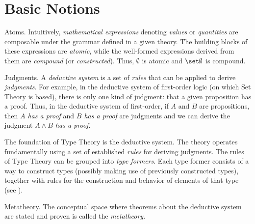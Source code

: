 \section{Basic Notions}
\begin{lpar}{Atoms.}
    Intuitively, \textsl{mathematical expressions} denoting \textit{values} or \textit{quantities} are composable under the grammar defined in a given theory. The building blocks of these expressions are \textsl{atomic}, while the well-formed expressions derived from them are \textsl{compound} (or \textsl{constructed}). Thus, $\emptyset$ is atomic and $\set\emptyset$ is compound.
\end{lpar}

\begin{lpar}{Judgments.}
    A \textsl{deductive system} is a set of \textsl{rules} that can be applied to derive \textsl{judgments}. For example, in the deductive system of first-order logic (on which Set Theory is based), there is only one kind of judgment: that a given proposition has a proof. Thus, in the deductive system of first-order, if $A$ and $B$ are propositions, then \textit{$A$ has a proof} and \textit{$B$ has a proof} are judgments and we can derive the judgment \textit{$A\wedge B$ has a proof}.

    The foundation of Type Theory is the deductive system. The theory operates fundamentally using a set of established \textit{rules} for deriving judgments. The rules of Type Theory can be grouped into \textit{type formers}. Each type former consists of a way to construct types (possibly making use of previously constructed types), together with rules for the construction and behavior of elements of that type (see ).
\end{lpar}

\begin{lpar}{Metatheory.}
    The conceptual space where theorems about the deductive system are stated and proven is called the \textsl{metatheory}.
\end{lpar}

